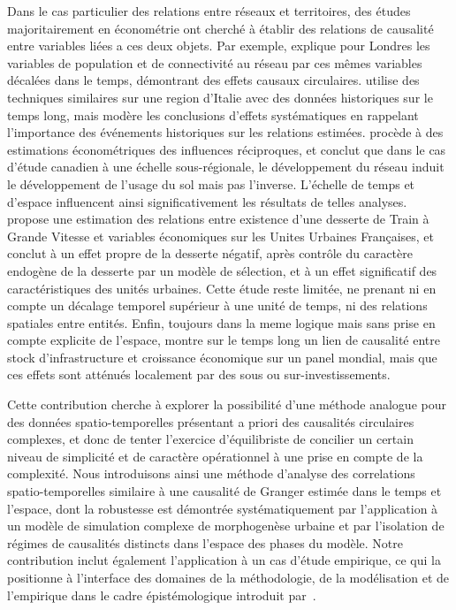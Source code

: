 \documentclass[french]{./sageo}
\begin{document}
Dans le cas particulier des relations entre réseaux et territoires, des études majoritairement en économétrie ont cherché à établir des relations de causalité entre variables liées a ces deux objets. Par exemple, \cite{levinson2008density} explique pour Londres les variables de population et de connectivité au réseau par ces mêmes variables décalées dans le temps, démontrant des effets causaux circulaires. \cite{doi10.1068/b39089} utilise des techniques similaires sur une region d'Italie avec des données historiques sur le temps long, mais modère les conclusions d'effets systématiques en rappelant l'importance des événements historiques sur les relations estimées. \cite{cuthbert2005empirical} procède à des estimations économétriques des influences réciproques, et conclut que dans le cas d'étude canadien à une échelle sous-régionale, le développement du réseau induit le développement de l'usage du sol mais pas l'inverse. L'échelle de temps et d'espace influencent ainsi significativement les résultats de telles analyses. \cite{koninghal-00962384} propose une estimation des relations entre existence d'une desserte de Train à Grande Vitesse et variables économiques sur les Unites Urbaines Françaises, et conclut à un effet propre de la desserte négatif, après contrôle du caractère endogène de la desserte par un modèle de sélection, et à un effet significatif des caractéristiques des unités urbaines. Cette étude reste limitée, ne prenant ni en compte un décalage temporel supérieur à une unité de temps, ni des relations spatiales entre entités. Enfin, toujours dans la meme logique mais sans prise en compte explicite de l'espace, \cite{MANCMANC1073} montre sur le temps long un lien de causalité entre stock d'infrastructure et croissance économique sur un panel mondial, mais que ces effets sont atténués localement par des sous ou sur-investissements.



Cette contribution cherche à explorer la possibilité d'une méthode analogue pour des données spatio-temporelles présentant a priori des causalités circulaires complexes, et donc de tenter l'exercice d'équilibriste de concilier un certain niveau de simplicité et de caractère opérationnel à une prise en compte de la complexité. Nous introduisons ainsi une méthode d'analyse des correlations spatio-temporelles similaire à une causalité de Granger estimée dans le temps et l'espace, dont la robustesse est démontrée systématiquement par l'application à un modèle de simulation complexe de morphogenèse urbaine et par l'isolation de régimes de causalités distincts dans l'espace des phases du modèle. Notre contribution inclut également l'application à un cas d'étude empirique, ce qui la positionne à l'interface des domaines de la méthodologie, de la modélisation et de l'empirique dans le cadre épistémologique introduit par~\cite{2017arXiv170609244R}.
\end{document}
